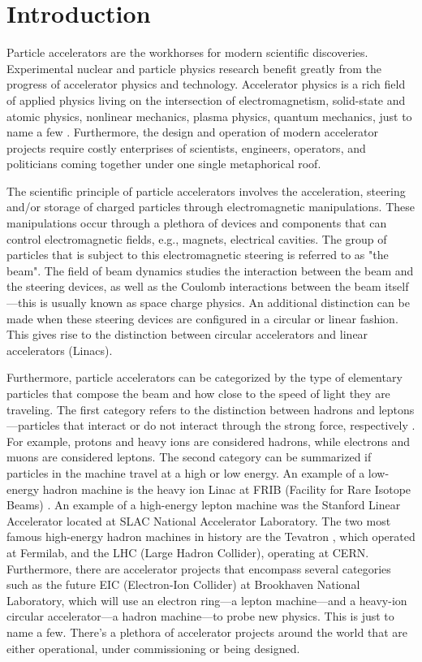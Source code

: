 \chapter{Introduction}
\label{sec:ch1}
 
Particle accelerators are the workhorses for modern scientific discoveries. Experimental nuclear and particle physics research benefit greatly from the progress of accelerator physics and technology. Accelerator physics is a rich field of applied physics living on the intersection of electromagnetism, solid-state and atomic physics, nonlinear mechanics, plasma physics, quantum mechanics, just to name a few \cite{sylee}. Furthermore, the design and operation of modern accelerator projects require costly enterprises of scientists, engineers, operators, and politicians coming together under one single metaphorical roof.         

The scientific principle of particle accelerators involves the acceleration, steering and/or storage of charged particles through electromagnetic manipulations. These manipulations occur through a plethora of devices and components that can control electromagnetic fields, e.g., magnets, electrical cavities. The group of particles that is subject to this electromagnetic steering is referred to as "the beam". The field of beam dynamics studies the interaction between the beam and the steering devices, as well as the Coulomb interactions between the beam itself---this is usually known as space charge physics. An additional distinction can be made when these steering devices are configured in a circular or linear fashion. This gives rise to the distinction between circular accelerators and linear accelerators (Linacs).

Furthermore, particle accelerators can be categorized by the type of elementary particles that compose the beam and how close to the speed of light they are traveling. The first category refers to the distinction between hadrons and leptons---particles that interact or do not interact through the strong force, respectively \cite{griffiths}. For example, protons and heavy ions are considered hadrons, while electrons and muons are considered leptons. The second category can be summarized if particles in the machine travel at a high or low energy. An example of a low-energy hadron machine is the heavy ion Linac at FRIB (Facility for Rare Isotope Beams) \cite{frib}. An example of a high-energy lepton machine was the Stanford Linear Accelerator located at SLAC National Accelerator Laboratory. The two most famous high-energy hadron machines in history are the Tevatron \cite{tevatron}, which operated at Fermilab, and the LHC (Large Hadron Collider), operating at CERN. Furthermore, there are accelerator projects that encompass several categories such as the future EIC (Electron-Ion Collider) at Brookhaven National Laboratory, which will use an electron ring---a lepton machine---and a heavy-ion circular accelerator---a hadron machine---to probe new physics. This is just to name a few. There's a plethora of accelerator projects around the world that are either operational, under commissioning or being designed. 

